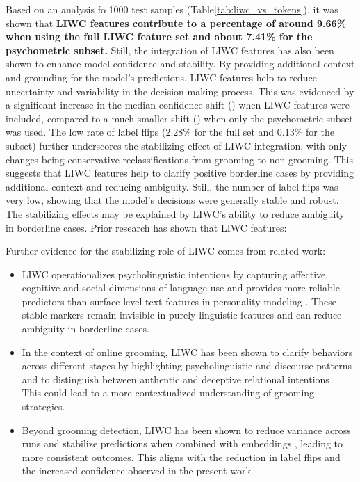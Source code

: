 Based on an analysis fo 1000 test samples (Table\ref{tab:liwc_vs_tokens}), it was shown that \textbf{LIWC features contribute to a percentage of around 9.66\% when using the full LIWC feature set and about 7.41\% for the psychometric subset.} Still, the integration of LIWC features has also been shown to enhance model confidence and stability. By providing additional context and grounding for the model's predictions, LIWC features help to reduce uncertainty and variability in the decision-making process. This was evidenced by a significant increase in the median confidence shift (\Delta \mu {}) when LIWC features were included, compared to a much smaller shift (\Delta \mu {}) when only the psychometric subset was used. The low rate of label flips (2.28\% for the full set and 0.13\% for the subset) further underscores the stabilizing effect of LIWC integration, with only changes being conservative reclassifications from grooming to non-grooming. This suggests that LIWC features help to clarify positive borderline cases by providing additional context and reducing ambiguity. Still, the number of label flips was very low, showing that the model's decisions were generally stable and robust. The stabilizing effects may be explained by LIWC’s ability to reduce ambiguity in borderline cases. Prior research has shown that LIWC features:

Further evidence for the stabilizing role of LIWC comes from related work:

\begin{itemize}
    \item LIWC operationalizes psycholinguistic intentions by capturing affective, cognitive and social dimensions of language use \cite{pennebaker2022liwc} and provides more reliable predictors than surface-level text features in personality modeling \cite{farnadi2018user}. These stable markers remain invisible in purely linguistic features and can reduce ambiguity in borderline cases.
    \item In the context of online grooming, LIWC has been shown to clarify behaviors across different stages by highlighting psycholinguistic and discourse patterns \cite{Cano2014} and to distinguish between authentic and deceptive relational intentions \cite{broome2020psycholinguistic}. This could lead to a more contextualized understanding of grooming strategies.
    \item Beyond grooming detection, LIWC has been shown to reduce variance across runs and stabilize predictions when combined with embeddings \cite{mehta2020bottomup}, leading to more consistent outcomes. This aligns with the reduction in label flips and the increased confidence observed in the present work.
\end{itemize}

